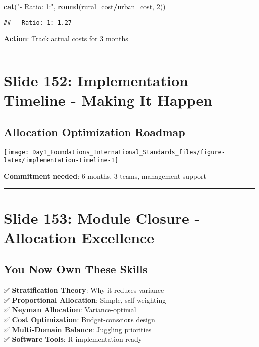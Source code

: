 \documentclass[
]{article}
\newenvironment{Shaded}{\begin{snugshade}}{\end{snugshade}}
\newcommand{\DecValTok}[1]{\textcolor[rgb]{0.00,0.00,0.81}{#1}}
\newcommand{\FunctionTok}[1]{\textcolor[rgb]{0.13,0.29,0.53}{\textbf{#1}}}
\newcommand{\NormalTok}[1]{#1}
\newcommand{\SpecialCharTok}[1]{\textcolor[rgb]{0.81,0.36,0.00}{\textbf{#1}}}
\newcommand{\StringTok}[1]{\textcolor[rgb]{0.31,0.60,0.02}{#1}}
\begin{document}
\begin{Shaded}
\begin{Highlighting}[]
\FunctionTok{cat}\NormalTok{(}\StringTok{"{-} Ratio: 1:"}\NormalTok{, }\FunctionTok{round}\NormalTok{(rural\_cost}\SpecialCharTok{/}\NormalTok{urban\_cost, }\DecValTok{2}\NormalTok{))}
\end{Highlighting}
\end{Shaded}

\begin{verbatim}
## - Ratio: 1: 1.27
\end{verbatim}

\textbf{Action}: Track actual costs for 3 months

\begin{center}\rule{0.5\linewidth}{0.5pt}\end{center}

\section{Slide 152: Implementation Timeline - Making It
Happen}\label{slide-152-implementation-timeline---making-it-happen}

\subsection{Allocation Optimization
Roadmap}\label{allocation-optimization-roadmap}

\texttt{[image: Day1\_Foundations\_International\_Standards\_files/figure-latex/implementation-timeline-1]}

\textbf{Commitment needed}: 6 months, 3 teams, management support

\begin{center}\rule{0.5\linewidth}{0.5pt}\end{center}

\section{Slide 153: Module Closure - Allocation
Excellence}\label{slide-153-module-closure---allocation-excellence}

\subsection{You Now Own These Skills}\label{you-now-own-these-skills}

✅ \textbf{Stratification Theory}: Why it reduces variance\\
✅ \textbf{Proportional Allocation}: Simple, self-weighting\\
✅ \textbf{Neyman Allocation}: Variance-optimal\\
✅ \textbf{Cost Optimization}: Budget-conscious design\\
✅ \textbf{Multi-Domain Balance}: Juggling priorities\\
✅ \textbf{Software Tools}: R implementation ready
\end{document}
